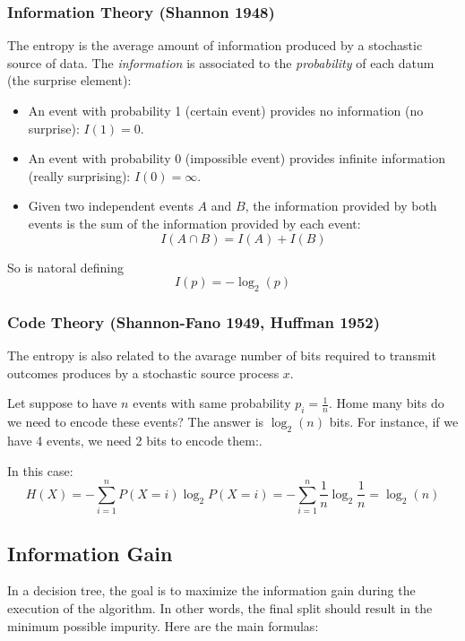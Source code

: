 \subsubsection{Information Theory (Shannon 1948)}
The entropy is the average amount of information produced by a stochastic source of data. The \textit{information} is associated to the \textit{probability} of each datum (the surprise element):
\begin{itemize}
    \item An event with probability 1 (certain event) provides no information (no surprise): \(I(1)=0\).
    \item An event with probability 0 (impossible event) provides infinite information (really surprising): \(I(0)=\infty\).
    \item Given two independent events \(A\) and \(B\), the information provided by both events is the sum of the information provided by each event:
    \[
        I(A \cap B) = I(A) + I(B)
    \]
\end{itemize}
So is natoral defining 
\[
    I(p) = -\log_2(p)
\]
\subsubsection{Code Theory (Shannon-Fano 1949, Huffman 1952)}
The entropy is also related to the avarage number of bits required to transmit outcomes produces by a stochastic source process $x$.

Let suppose to have $n$ events with same probability \(p_i = \frac{1}{n}\). Home many bits do we need to encode these events? The answer is \(\log_2(n)\) bits. For instance, if we have 4 events, we need 2 bits to encode them:.

In this case:
\[
    H(X) = -\sum_{i=1}^{n} P(X=i)\log_2 P(X=i) = - \sum_{i=1}^{n} \frac{1}{n} \log_2 \frac{1}{n} = \log_2(n)
\]

\subsection{Information Gain}

In a decision tree, the goal is to maximize the information gain during the execution of the algorithm. 
In other words, the final split should result in the minimum possible impurity. 
Here are the main formulas:



